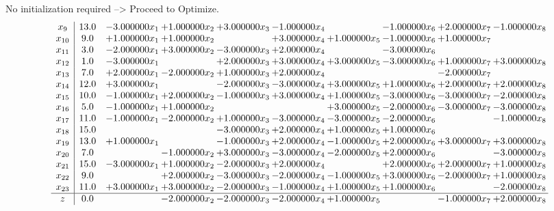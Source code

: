 \documentclass[10pt]{article}
\begin{document}
No initialization required --> Proceed to Optimize. 
\[\begin{array}{c| c c@{\hskip 2pt} c@{\hskip 2pt} c@{\hskip 2pt} c@{\hskip 2pt} c@{\hskip 2pt} c@{\hskip 2pt} c@{\hskip 2pt} c@{\hskip 2pt} }
 x_{9}   &  13.0 & -3.000000 x_{1} & + 1.000000 x_{2} & + 3.000000 x_{3} & -1.000000 x_{4} &   & -1.000000 x_{6} & + 2.000000 x_{7} & -1.000000 x_{8}\\
 x_{10}   &  9.0 & + 1.000000 x_{1} & + 1.000000 x_{2} &   & + 3.000000 x_{4} & + 1.000000 x_{5} & -1.000000 x_{6} & + 1.000000 x_{7} &   \\
 x_{11}   &  3.0 & -2.000000 x_{1} & + 3.000000 x_{2} & -3.000000 x_{3} & + 2.000000 x_{4} &   & -3.000000 x_{6} &    &   \\
 x_{12}   &  1.0 & -3.000000 x_{1} &   & + 2.000000 x_{3} & + 3.000000 x_{4} & + 3.000000 x_{5} & -3.000000 x_{6} & + 1.000000 x_{7} & + 3.000000 x_{8}\\
 x_{13}   &  7.0 & + 2.000000 x_{1} & -2.000000 x_{2} & + 1.000000 x_{3} & + 2.000000 x_{4} &    &   & -2.000000 x_{7} &   \\
 x_{14}   &  12.0 & + 3.000000 x_{1} &   & -2.000000 x_{3} & -3.000000 x_{4} & + 3.000000 x_{5} & + 1.000000 x_{6} & + 2.000000 x_{7} & + 2.000000 x_{8}\\
 x_{15}   &  10.0 & -1.000000 x_{1} & + 2.000000 x_{2} & -1.000000 x_{3} & + 3.000000 x_{4} & + 1.000000 x_{5} & -3.000000 x_{6} & -3.000000 x_{7} & -2.000000 x_{8}\\
 x_{16}   &  5.0 & -1.000000 x_{1} & + 1.000000 x_{2} &    &   & + 3.000000 x_{5} & -2.000000 x_{6} & -3.000000 x_{7} & -3.000000 x_{8}\\
 x_{17}   &  11.0 & -1.000000 x_{1} & -2.000000 x_{2} & + 1.000000 x_{3} & -3.000000 x_{4} & -3.000000 x_{5} & -2.000000 x_{6} &   & -1.000000 x_{8}\\
 x_{18}   &  15.0  &    &   & -3.000000 x_{3} & + 2.000000 x_{4} & + 1.000000 x_{5} & + 1.000000 x_{6} &    &   \\
 x_{19}   &  13.0 & + 1.000000 x_{1} &   & -1.000000 x_{3} & + 2.000000 x_{4} & -1.000000 x_{5} & + 2.000000 x_{6} & + 3.000000 x_{7} & + 3.000000 x_{8}\\
 x_{20}   &  7.0  &   & -1.000000 x_{2} & + 3.000000 x_{3} & -3.000000 x_{4} & -2.000000 x_{5} & + 2.000000 x_{6} &   & -3.000000 x_{8}\\
 x_{21}   &  15.0 & -3.000000 x_{1} & + 1.000000 x_{2} & -2.000000 x_{3} & + 2.000000 x_{4} &   & + 2.000000 x_{6} & + 2.000000 x_{7} & + 1.000000 x_{8}\\
 x_{22}   &  9.0  &   & + 2.000000 x_{2} & -3.000000 x_{3} & -2.000000 x_{4} & -1.000000 x_{5} & + 3.000000 x_{6} & -2.000000 x_{7} & + 1.000000 x_{8}\\
 x_{23}   &  11.0 & + 3.000000 x_{1} & + 3.000000 x_{2} & -2.000000 x_{3} & -1.000000 x_{4} & + 1.000000 x_{5} & + 1.000000 x_{6} &   & -2.000000 x_{8}\\
\hline
z    &  0.0  &   & -2.000000 x_{2} & -2.000000 x_{3} & -2.000000 x_{4} & + 1.000000 x_{5} &   & -1.000000 x_{7} & + 2.000000 x_{8}\\
\end{array}\]
\end{document}
